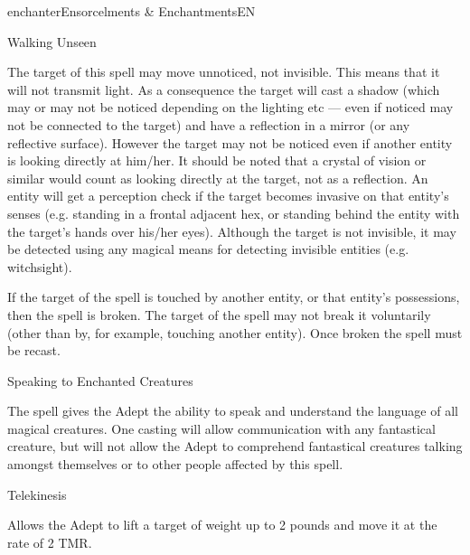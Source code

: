 \begin{College}[1.1]{enchanter}{Ensorcelments \& Enchantments}{EN}
\begin{spell}[G-4]{Walking Unseen}

\begin{effects}
The target of this spell may move unnoticed, not invisible.  This
means that it will not transmit light. As a consequence the target
will cast a shadow (which may or may not be noticed depending on the
lighting etc — even if noticed may not be connected to the target) and
have a reflection in a mirror (or any reflective surface).  However
the target may not be noticed even if another entity is looking
directly at him/her.  It should be noted that a crystal of vision or
similar would count as looking directly at the target, not as a
reflection.  An entity will get a perception check if the target
becomes invasive on that entity’s senses (e.g. standing in a frontal
adjacent hex, or standing behind the entity with the target’s hands
over his/her eyes). Although the target is not invisible, it may be
detected using any magical means for detecting invisible entities
(e.g. witchsight).

If the target of the spell is touched by another entity, or that
entity’s possessions, then the spell is broken.  The target of the
spell may not break it voluntarily (other than by, for example,
touching another entity).  Once broken the spell must be recast.
\end{effects}
\end{spell}

\begin{spell}[G-5]{Speaking to Enchanted Creatures}

\begin{effects}
The spell gives the Adept the ability to speak and understand the
language of all magical creatures.  One casting will allow
communication with any fantastical creature, but will not allow the
Adept to comprehend fantastical creatures talking amongst themselves
or to other people affected by this spell.
\end{effects}
\end{spell}

\begin{spell}[G-2]{Telekinesis}
\begin{effects}
Allows the Adept to lift a target of weight up to 2 pounds and move it
at the rate of 2 TMR.
\end{effects}
\end{spell}


\end{College}
